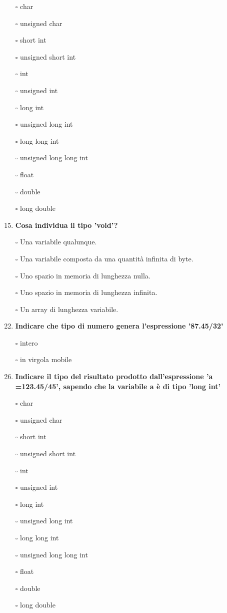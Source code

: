 \documentclass[11pt]{article}
\begin{document}
\begin{enumerate}
\item[$\square$] char
\item[$\square$] unsigned char
\item[$\square$] short int
\item[$\square$] unsigned short int
\item[$\square$] int
\item[$\square$] unsigned int
\item[$\square$] long int
\item[$\square$] unsigned long int
\item[$\square$] long long int
\item[$\square$] unsigned long long int
\item[$\square$] float
\item[$\square$] double
\item[$\square$] long double
\item [\nonumber]
\item {\bf Cosa individua il tipo 'void'?}
\item[$\square$]  Una variabile qualunque.
\item[$\square$]  Una variabile composta da una quantit\`{a} infinita di byte.
\item[$\square$]  Uno spazio in memoria di lunghezza nulla.
\item[$\square$]  Uno spazio in memoria di lunghezza infinita.
\item[$\square$]  Un array di lunghezza variabile.
\item [\nonumber]
\item{\bf Indicare che tipo di numero genera l'espressione '87.45/32'}

\item[$\square$] intero
\item[$\square$] in virgola mobile

\item [\nonumber]
\item {\bf Indicare il tipo del risultato prodotto dall'espressione 'a =123.45/45', sapendo che la variabile a \`{e} di tipo 'long int'}

\item[$\square$] char
\item[$\square$] unsigned char
\item[$\square$] short int
\item[$\square$] unsigned short int
\item[$\square$] int
\item[$\square$] unsigned int
\item[$\square$] long int
\item[$\square$] unsigned long int
\item[$\square$] long long int
\item[$\square$] unsigned long long int
\item[$\square$] float
\item[$\square$] double
\item[$\square$] long double


\end{enumerate}
\end{document}
